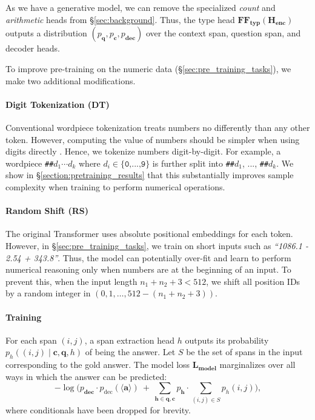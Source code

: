 \documentclass[11pt,a4paper]{article}
\newcommand\question{\mathbf{q}}
\newcommand\context{\mathbf{c   }}
\newcommand\answer{\mathbf{a}}
\begin{document}
As we have a generative model, we can remove the specialized \emph{count} and \emph{arithmetic} heads
from \S\ref{sec:background}. Thus, the type head
$\mathbf{FF_{typ}}(\mathbf{H_{enc}})$ outputs a distribution $(p_{\question},
p_{\context}, p_{\mathbf{dec}})$ over the context span, question span, and decoder heads.

To improve pre-training on the numeric data
(\S\ref{sec:pre_training_tasks}), we make two
additional modifications.

\paragraph{Digit Tokenization (DT)} 
Conventional wordpiece tokenization treats numbers no differently than any other
token. However, computing the value of numbers should be simpler
when using digits directly \cite{wallace2019numeracy}.  
Hence, we tokenize numbers digit-by-digit.
For example, a wordpiece \texttt{\#\#$d_1\cdots d_k$} where $d_i \in
\texttt{\{0,...,9\}}$ is further split into \texttt{\#\#$d_1$},
..., \texttt{\#\#$d_k$}. 
We show in \S\ref{section:pretraining_results} that this
substantially improves sample complexity when training to perform
numerical operations.

\paragraph{Random Shift (RS)}
The original Transformer uses absolute positional
embeddings for each token. 
However, in \S\ref{sec:pre_training_tasks}, we train on short inputs
such as \emph{``1086.1 - 2.54 + 343.8''}. Thus, the model can potentially over-fit and 
learn to 
perform numerical reasoning only when numbers are at the beginning of an input. To prevent this, when the
input length $n_1+n_2+3 < 512$, we shift all position IDs by a random integer in
$(0, 1, \dots, 512 - (n_1 + n_2 + 3))$.

\paragraph{Training}
For each span $(i,j)$, a span extraction head $h$ outputs its probability
$p_{h}((i,j) \mid \context,\question, h)$ of being the answer. Let $S$ be the set of spans in the input corresponding to the gold answer. 
The model loss $\mathbf{L_{\text{model}}}$ marginalizes over all ways in which the answer can be predicted:
\[
-\log\bigg(p_{\mathbf{dec}}\cdot p_{\text{dec}}(\langle\answer\rangle)  \  +  \ \sum_{\mathbf{h} \in \question,\context} p_\mathbf{h} \cdot\sum_{(i,j) \in S} p_h(i,j)\bigg),
\]
where conditionals have been dropped for brevity.
\end{document}
